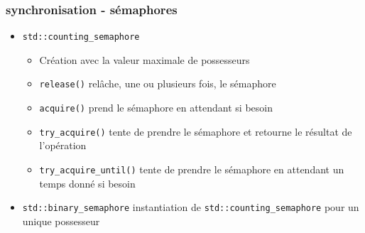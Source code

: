 \documentclass[C++.tex]{subfiles}
\begin{document}
\begin{frame}[fragile]
	\frametitle{synchronisation - sémaphores}
	\begin{itemize}
		\item \lstinline|std::counting_semaphore|
		\begin{itemize}
			\item Création avec la valeur maximale de possesseurs
			\item \lstinline|release()| relâche, une ou plusieurs fois, le sémaphore


			\item \lstinline|acquire()| prend le sémaphore en attendant si besoin


			\item \lstinline|try_acquire()| tente de prendre le sémaphore et retourne le résultat de l'opération


			\item \lstinline|try_acquire_until()| tente de prendre le sémaphore en attendant un temps donné si besoin


		\end{itemize}
		\item \lstinline|std::binary_semaphore|	instantiation de \lstinline|std::counting_semaphore| pour un unique possesseur
	\end{itemize}
\end{frame}
\end{document}
